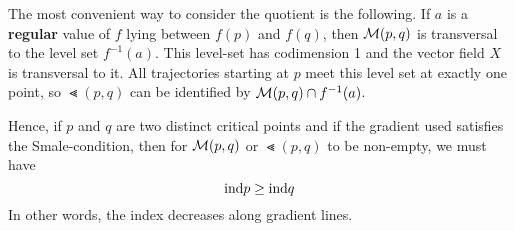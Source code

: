 \begin{remark}
    The most convenient way to consider the quotient is the following. If $a$ is a 
    \textbf{regular} value of $f$ lying between $f(p)$ and $f(q)$, then ${ \mathcal{M} }(p, q)$ 
    is transversal to the level set $f^{-1}(a)$. This level-set has codimension 1 and the 
    vector field $X$ is transversal to it. All trajectories starting at $p$ meet this level
    set at exactly one point, so $\Lt(p, q)$ can be identified by 
    ${ \mathcal{M} }(p, q) \cap f^{-1}(a)$.

    Hence, if $p$ and $q$ are two distinct critical points and if the gradient used 
    satisfies the Smale-condition, then for ${ \mathcal{M} }(p, q)$ or $\Lt(p, q)$
    to be non-empty, we must have 
    \[ { \operatorname{ind} } p \geq { \operatorname{ind} } q \]
    In other words, the index decreases along gradient lines.
\end{remark}
